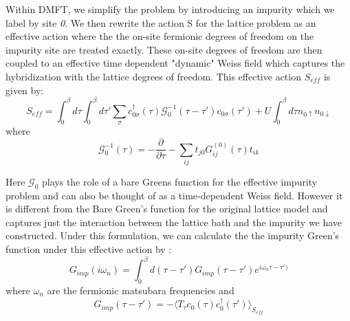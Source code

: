 \documentclass[12pt,letter]{article}
\newcommand{\la}{\langle}
\newcommand{\ra}{\rangle}
\newcommand{\cdag}{c^{\dagger}}
\newcommand{\upa}{\uparrow}
\newcommand{\dow}{\downarrow}
\newcommand{\sig}{\sigma}
\newcommand{\ib}{\int_{0}^{\beta}}
\begin{document}
Within DMFT, we simplify the problem by introducing an impurity which we label by site \textit{0}. We then rewrite the action S for the lattice problem as an effective action where the the on-site fermionic degrees of freedom on the impurity site are treated exactly. These on-site degrees of freedom are then coupled to an effective time dependent "dynamic" Weiss field which captures the hybridization with the lattice degrees of freedom.  This effective action $S_{eff}$ is given by:
\begin{equation} \label{S_eff}
 S_{eff}= \ib d\tau \ib d \tau' \sum_{\sig} \cdag_{0\sig}(\tau) \mathcal{G}_{0}^{-1}(\tau -\tau') c_{0\sig}(\tau') +U \ib d\tau n_{0\upa} n_{0 \dow}
 \end{equation} 
where 
 \begin{equation}\label{G0_imp}
  \mathcal{G}_{0}^{-1}(\tau)= -\dfrac{\partial} {\partial \tau} -\sum_{ij} t_{j0} G^{(0)} _{ij} (\tau) t_{ik}
 \end{equation} 
  
Here $\mathcal{G}_0$ plays the role of a bare Greens function for the effective impurity problem and can also be thought of as a time-dependent Weiss field. However it is different from the Bare Green's function for the original lattice model and captures just the interaction between the lattice bath and the impurity we have constructed. Under this formulation, we can calculate the the impurity Green's function under this effective action by :
\begin{equation}
G_{imp}(i \omega_n)=\ib d(\tau - \tau') G_{imp}(\tau - \tau') e^{i\omega_n \tau - \tau') }
\end{equation}
where $\omega_n$ are the fermionic matsubara frequencies and
\begin{equation}
G_{imp}(\tau - \tau')= - \la T_{\tau} c_0(\tau) \cdag_0(\tau') \ra _{S_{eff}}
\end{equation}
\end{document}
